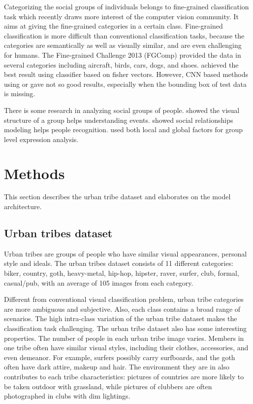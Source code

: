\documentclass[10pt,twocolumn,letterpaper]{article}
\begin{document}
Categorizing the social groups of individuals belongs to fine-grained classification task which recently draws more interest of the computer vision community. It aims at giving the fine-grained categories in a certain class. Fine-grained classification is more difficult than conventional classification tasks, because the categories are semantically as well as visually similar, and are even challenging for humans. The Fine-grained Challenge 2013 (FGComp) provided the data in several categories including aircraft, birds, cars, dogs, and shoes. \cite{finegrain} achieved the best result using classifier based on fisher vectors. However, CNN based methods using \cite{caffe} or \cite{decaf} gave not so good results, especially when the bounding box of test data is missing.

There is some research in analyzing social groups of people. \cite{groupstructure} showed the visual structure of a group helps understanding events. \cite{socialrelationship} showed social relationships modeling helps people recognition. \cite{happiest} used both local and global factors for group level expression analysis.




\section{Methods}
This section describes the urban tribe dataset and elaborates on the model architecture.

\subsection{Urban tribes dataset}
Urban tribes are groups of people who have similar visual appearances, personal style and ideals. The urban tribes dataset consists of 11 different categories: biker, country, goth, heavy-metal, hip-hop, hipster, raver, surfer, club, formal, casual/pub, with an average of 105 images from each category. 

Different from conventional visual classification problem, urban tribe categories are more ambiguous and subjective. Also, each class contains a broad range of scenarios. The high intra-class variation of the urban tribe dataset makes the classification task challenging. The urban tribe dataset also has some interesting properties. The number of people in each urban tribe image varies. Members in one tribe often have similar visual styles, including their clothes, accessories, and even demeanor. For example, surfers possibly carry surfboards, and the goth often have dark attire, makeup and hair. The environment they are in also contributes to each tribe characteristics: pictures of countries are more likely to be taken outdoor with grassland, while pictures of clubbers are often photographed in clubs with dim lightings. 
\end{document}
